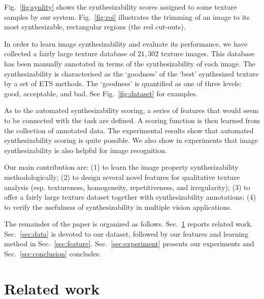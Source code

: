 \documentclass[10pt,twocolumn,letterpaper]{article}
\begin{document}
Fig.~\ref{fig:synlity} shows the synthesizability scores assigned to some texture samples 
by our system. Fig.~\ref{fig:roi} illustrates the trimming of an image to its most
synthesizable, rectangular regions (the red cut-outs).

In order to learn image synthesizability and evaluate its performance, we have collected
a fairly large texture database of $21,302$ texture images. This database has been manually annotated 
in terms of the synthesizability of each image. The synthesizability is characterised as the 
`goodness' of the `best' synthesized texture by a set of ETS methods. The `goodness' is quantified 
as one of three levels: good, acceptable, and bad. See Fig.~\ref{fig:dataset} for examples. 



As to the automated synthesizability scoring, a series of features that would seem to be connected with the task are defined.
A scoring function is then learned from the collection of annotated data.
The experimental results show that automated synthesizability scoring is quite possible.
We also show in experiments that image synthesizability is also helpful for image recognition.

Our main contribution are: (1) to learn the image property
synthesizability methodologically; (2) to design several novel
features for qualitative texture analysis (esp. textureness,
homogeneity, repetitiveness, and irregularity); (3) to offer a fairly
large texture dataset together with synthesizability annotations; (4)
to verify the usefulness of synthesizability in multiple vision
applications.


The remainder of the paper is organized as follows.
Sec.~\ref{sec:related} reports related work.
Sec.~\ref{sec:data} is devoted to our dataset, followed by our features and learning method in Sec.~\ref{sec:feature}.
Sec.~\ref{sec:experiment} presents our experiments and Sec.~\ref{sec:conclusion} concludes. 


\section{Related work}
\label{sec:related}
\end{document}

